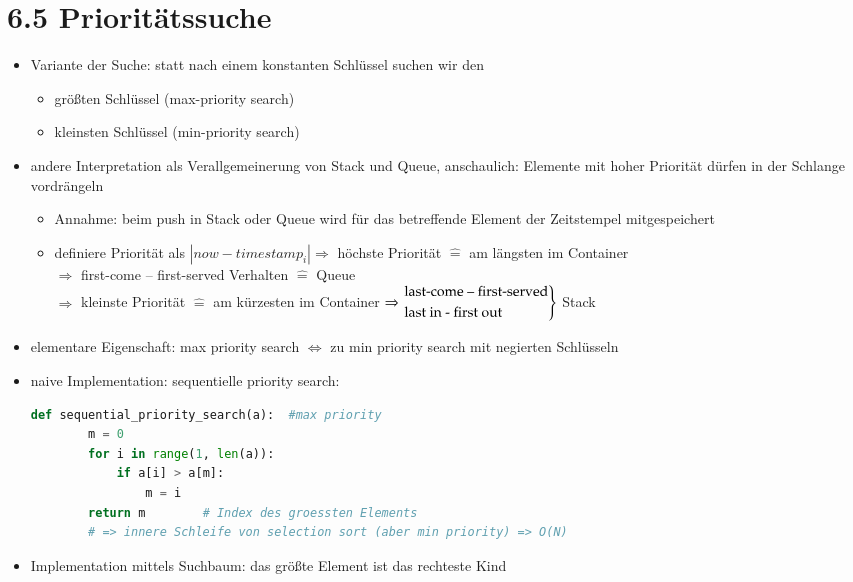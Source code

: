 \documentclass[11pt, fleqn]{scrreprt}
\begin{document}
\section*{6.5 Prioritätssuche}
\begin{itemize}
	\item Variante der Suche: statt nach einem konstanten Schlüssel suchen wir den
	\begin{itemize}
		\item größten Schlüssel (max-priority search)
		\item kleinsten Schlüssel (min-priority search)
	\end{itemize}
	\item andere Interpretation als Verallgemeinerung von Stack und Queue, anschaulich: Elemente mit hoher Priorität dürfen in der Schlange vordrängeln
	\begin{itemize}
		\item Annahme: beim push in Stack oder Queue wird für das betreffende Element der Zeitstempel mitgespeichert
		\item definiere Priorität als $| now - timestamp_i| \Rightarrow$ höchste Priorität $\widehat{=}$ am längsten im Container \\
		\hspace*{1cm} $\Rightarrow$ first-come – first-served Verhalten $\widehat{=}$ Queue \\
		$\Rightarrow$ kleinste Priorität $\widehat{=}$ am kürzesten im Container $\Rightarrow \begin{rcases} \text{last-come – first-served} \\
			\text{last in - first out}\end{rcases}$ Stack
	\end{itemize}
		\item elementare Eigenschaft: max priority search $\Leftrightarrow$ zu min priority search mit negierten Schlüsseln
		\item naive Implementation: sequentielle priority search:
		\begin{lstlisting}[language=Python]
	def sequential_priority_search(a):	#max priority
		m = 0
		for i in range(1, len(a)):
			if a[i] > a[m]:
				m = i
		return m		# Index des groessten Elements
		# => innere Schleife von selection sort (aber min priority) => O(N)
		\end{lstlisting}
		\item Implementation mittels Suchbaum: das größte Element ist das \glqq rechteste Kind\grqq

\end{itemize}
\end{document}
